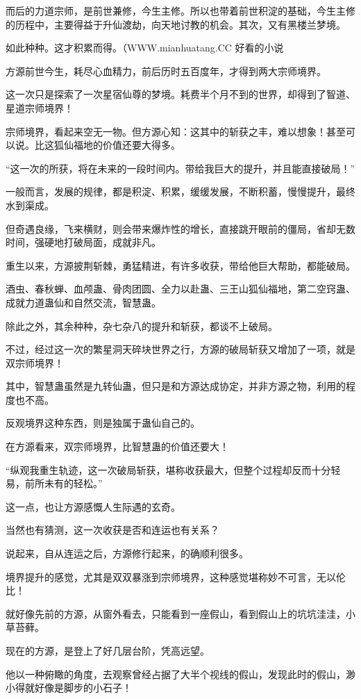 \begin{this_body}
而后的力道宗师，是前世兼修，今生主修。所以也带着前世积淀的基础，今生主修的历程中，主要得益于升仙渡劫，向天地讨教的机会。其次，又有黑楼兰梦境。

如此种种。这才积累而得。（WWW.mianhuatang.CC 好看的小说

方源前世今生，耗尽心血精力，前后历时五百度年，才得到两大宗师境界。

这一次只是探索了一次星宿仙尊的梦境。耗费半个月不到的世界，却得到了智道、星道宗师境界！

宗师境界，看起来空无一物。但方源心知：这其中的斩获之丰，难以想象！甚至可以说。比这狐仙福地的价值还要大得多。

“这一次的所获，将在未来的一段时间内。带给我巨大的提升，并且能直接破局！”

一般而言，发展的规律，都是积淀、积累，缓缓发展，不断积蓄，慢慢提升，最终水到渠成。

但奇遇良缘，飞来横财，则会带来爆炸性的增长，直接跳开眼前的僵局，省却无数时间，强硬地打破局面，成就非凡。

重生以来，方源披荆斩棘，勇猛精进，有许多收获，带给他巨大帮助，都能破局。

酒虫、春秋蝉、血颅蛊、骨肉团圆、全力以赴蛊、三王山狐仙福地，第二空窍蛊、成就力道蛊仙和自然交流，智慧蛊。

除此之外，其余种种，杂七杂八的提升和斩获，都谈不上破局。

不过，经过这一次的繁星洞天碎块世界之行，方源的破局斩获又增加了一项，就是双宗师境界！

其中，智慧蛊虽然是九转仙蛊，但只是和方源达成协定，并非方源之物，利用的程度也不高。

反观境界这种东西，则是独属于蛊仙自己的。

在方源看来，双宗师境界，比智慧蛊的价值还要大！

“纵观我重生轨迹，这一次破局斩获，堪称收获最大，但整个过程却反而十分轻易，前所未有的轻松。”

这一点，也让方源感慨人生际遇的玄奇。

当然也有猜测，这一次收获是否和连运也有关系？

说起来，自从连运之后，方源修行起来，的确顺利很多。

境界提升的感觉，尤其是双双暴涨到宗师境界，这种感觉堪称妙不可言，无以伦比！

就好像先前的方源，从窗外看去，只能看到一座假山，看到假山上的坑坑洼洼，小草苔藓。

现在的方源，是登上了好几层台阶，凭高远望。

他以一种俯瞰的角度，去观察曾经占据了大半个视线的假山，发现此时的假山，渺小得就好像是脚步的小石子！


\end{this_body}
